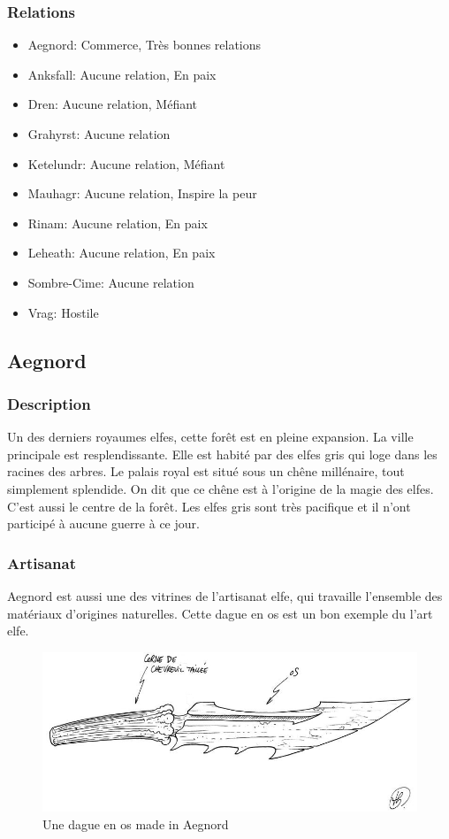 \subsubsection{Relations}
\begin{itemize}
\item Aegnord: Commerce, Très bonnes relations
\item Anksfall: Aucune relation, En paix 
\item Dren: Aucune relation, Méfiant    
\item Grahyrst: Aucune relation
\item Ketelundr: Aucune relation, Méfiant 
\item Mauhagr: Aucune relation, Inspire la peur
\item Rinam: Aucune relation, En paix 
\item Leheath:  Aucune relation, En paix 
\item Sombre-Cime: Aucune relation  
\item Vrag: Hostile
\end{itemize}
\subsection{Aegnord}
\subsubsection{Description}
\hypertarget{aegnord}{}Un des derniers royaumes elfes, cette forêt est en pleine expansion.
La ville principale est resplendissante.
Elle est habité par des elfes gris qui loge dans les racines des arbres.
Le palais royal est situé sous un chêne millénaire, tout simplement splendide.
On dit que ce chêne est à l'origine de la magie des elfes. C'est aussi le centre de la forêt.
Les elfes gris sont très pacifique et il n'ont participé à aucune guerre à ce jour. 
\subsubsection{Artisanat}
Aegnord est aussi une des vitrines de l'artisanat elfe, qui travaille l'ensemble des matériaux d'origines naturelles. Cette dague en os est un bon exemple du l'art elfe.
\begin{figure}[h]
\begin{center}
\includegraphics[scale=0.4]{./Ressources/medieval/dague_1.jpg}
\caption{Une dague en os made in Aegnord}
\end{center}
\end{figure}
